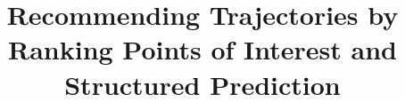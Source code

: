 \documentclass{sig-alternate-05-2015}
\begin{document}

\title{Recommending Trajectories by Ranking Points of Interest and Structured Prediction}


\maketitle

\begin{abstract}

\end{abstract}


{}


%


%





\end{document}
